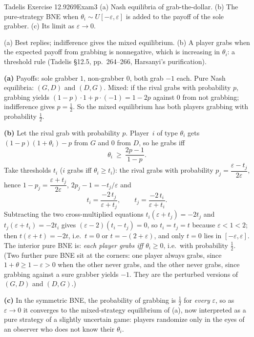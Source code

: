 \begin{exsol}{Tadelis Exercise 12.9}{269}{Exam}{3}
\asked (a) Nash equilibria of grab-the-dollar. (b) The pure-strategy BNE when $\theta_i\sim U[-\varepsilon,\varepsilon]$
is added to the payoff of the sole grabber. (c) Its limit as $\varepsilon\to0$.

\method (a) Best replies; indifference gives the mixed equilibrium. (b) A player grabs when the
expected payoff from grabbing is nonnegative, which is increasing in $\theta_i$: a threshold rule
(Tadelis \S12.5, pp.~264--266, Harsanyi's purification).

\solution
\textbf{(a)} Payoffs: sole grabber $1$, non-grabber $0$, both grab $-1$ each. Pure Nash equilibria:
$(G,D)$ and $(D,G)$. Mixed: if the rival grabs with probability $p$, grabbing yields
$(1-p)\cdot1+p\cdot(-1)=1-2p$ against $0$ from not grabbing; indifference gives $p=\tfrac12$. So the
mixed equilibrium has both players grabbing with probability $\tfrac12$.

\textbf{(b)} Let the rival grab with probability $p$. Player~$i$ of type $\theta_i$ gets
$(1-p)(1+\theta_i)-p$ from $G$ and $0$ from $D$, so he grabs iff
\[
  \theta_i\ \ge\ \frac{2p-1}{1-p}.
\]
Take thresholds $t_i$ ($i$ grabs iff $\theta_i\ge t_i$): the rival grabs with probability
$p_j=\dfrac{\varepsilon-t_j}{2\varepsilon}$, hence $1-p_j=\dfrac{\varepsilon+t_j}{2\varepsilon}$,
$2p_j-1=-t_j/\varepsilon$ and
\[
  t_i=\frac{-2\,t_j}{\varepsilon+t_j},\qquad t_j=\frac{-2\,t_i}{\varepsilon+t_i}.
\]
Subtracting the two cross-multiplied equations $t_i(\varepsilon+t_j)=-2t_j$ and
$t_j(\varepsilon+t_i)=-2t_i$ gives $(\varepsilon-2)(t_i-t_j)=0$, so $t_i=t_j=t$ because $\varepsilon<1<2$;
then $t(\varepsilon+t)=-2t$, i.e.\ $t=0$ or $t=-(2+\varepsilon)$, and only $t=0$ lies in
$[-\varepsilon,\varepsilon]$. The interior pure BNE is: \emph{each player grabs iff $\theta_i\ge0$}, i.e.\
with probability $\tfrac12$. (Two further pure BNE sit at the corners: one player always
grabs, since $1+\theta\ge1-\varepsilon>0$ when the other never grabs, and the other never grabs, since
grabbing against a sure grabber yields $-1$. They are the perturbed versions of $(G,D)$ and $(D,G)$.)

\textbf{(c)} In the symmetric BNE, the probability of grabbing is $\tfrac12$ for \emph{every}
$\varepsilon$, so as $\varepsilon\to0$ it converges to the mixed-strategy equilibrium of (a), now
interpreted as a pure strategy of a slightly uncertain game: players randomize only in the eyes of
an observer who does not know their $\theta_i$.


\end{exsol}
